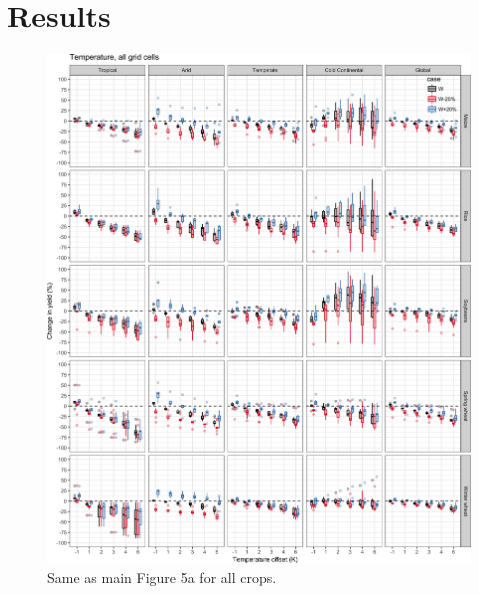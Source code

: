 \documentclass[10pt]{article}
\begin{document}
\clearpage
\section{Results}
\begin{figure}[h!]
\centering
\includegraphics[width=\textwidth]{s_sim_CG_T.png}
\caption{Same as main Figure 5a for all crops.}
\label{fig:temperautre}
\end{figure}
\end{document}
